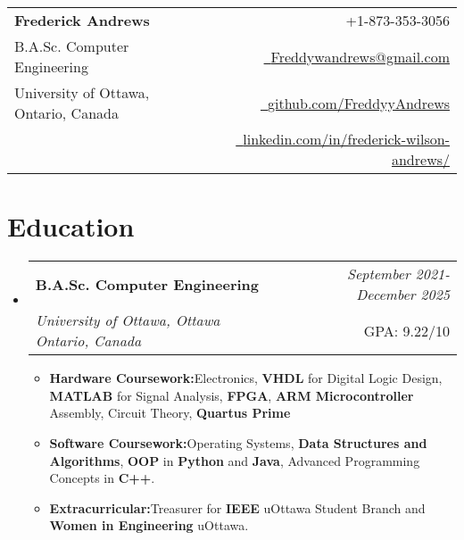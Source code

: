 \documentclass[a4paper,11pt]{article}
\makeatletter
\newcommand{\resumeItem}[2]{
  \item{
    \textbf{#1}{\hspace{0.5mm}#2 \vspace{-0.5mm}}
  }
}
\newcommand{\resumeSubheading}[4]{
\vspace{0.5mm}\item
    \begin{tabular*}{0.98\textwidth}[t]{l@{\extracolsep{\fill}}r}
        \textbf{#1} & \textit{\footnotesize{#4}} \\
        \textit{\footnotesize{#3}} &  \footnotesize{#2}\\
    \end{tabular*}
    \vspace{-2.4mm}
}
\newcommand{\resumeSubHeadingListStart}{\begin{itemize}[leftmargin=*,labelsep=0mm]}
\newcommand{\resumeItemListStart}{\begin{justify}\begin{itemize}[label=\textcolor{black}{--}, leftmargin=3ex, rightmargin=2ex, noitemsep,labelsep=1.2mm,itemsep=0mm]\small}
\newcommand{\resumeSubHeadingListEnd}{\end{itemize}\vspace{2mm}}
\newcommand{\resumeItemListEnd}{\end{itemize}\end{justify}\vspace{-2mm}}
\newcommand{\name}{Frederick Andrews} %
\newcommand{\phone}{873-353-3056} %
\newcommand{\emaila}{Freddywandrews@gmail.com} %
\makeatother
\begin{document}
\selectfont
{}

\setlength{\footskip}{5pt}



{
\begin{tabularx}{\linewidth}{L r} \\
  \textbf{\Large \name} & {\raisebox{0.0\height}{\footnotesize \faPhone}\ +1-\phone}\\
  B.A.Sc. Computer Engineering  & \href{mailto:\emaila}{\raisebox{0.0\height}{\footnotesize \faEnvelope}\ {\emaila}} \\
  {University of Ottawa, Ontario, Canada}& \href{https://github.com/FreddyyAndrews}{\raisebox{0.0\height}{\footnotesize \faGithub}\ {github.com/FreddyyAndrews}} \\  
& \href{https://www.linkedin.com/in/frederick-wilson-andrews/}{\raisebox{0.0\height}{\footnotesize \faLinkedin}\ {linkedin.com/in/frederick-wilson-andrews/}}
\end{tabularx}
}
\vspace{-8mm}

\section{\textbf{Education}}
  \resumeSubHeadingListStart
    \resumeSubheading
      {B.A.Sc. Computer Engineering}{GPA: 9.22/10}
      {University of Ottawa, Ottawa Ontario, Canada}{September 2021- December 2025}
      \resumeItemListStart
      \vspace{1.0mm}
      \resumeItem{Hardware Coursework:}
          {Electronics, \textbf{VHDL} for Digital Logic Design, \textbf{MATLAB} for Signal Analysis, \textbf{FPGA}, \textbf{ARM Microcontroller} Assembly, Circuit Theory, \textbf{Quartus Prime}}
          \vspace{1.0mm}
        \resumeItem{Software Coursework:}
          {Operating Systems, \textbf{Data Structures and Algorithms}, \textbf{OOP} in \textbf{Python} and \textbf{Java}, Advanced Programming Concepts in \textbf{C++}.}
          \vspace{1.0mm}
          \resumeItem{Extracurricular:}
          {Treasurer for \textbf{IEEE} uOttawa Student Branch and \textbf{Women in Engineering} uOttawa.}
      \resumeItemListEnd
  \resumeSubHeadingListEnd
\vspace{-8mm}
%
\end{document}
